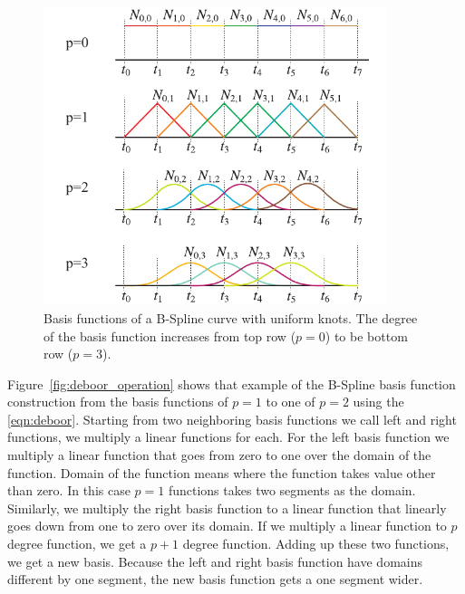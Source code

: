 \begin{figure}[htbp!]
\center
\includegraphics[width=100mm]{images/deboor_basis.pdf}
\caption{Basis functions of a B-Spline curve with uniform knots. The degree of the basis function increases from top row ($p=0$) to be bottom row ($p=3$). }
\label{fig:deboor_basis}
\end{figure}



Figure~\ref{fig:deboor_operation} shows that example of the B-Spline basis function construction from the basis functions of $p=1$ to one of $p=2$ using the \eqref{eqn:deboor}.
%
Starting from two neighboring basis functions we call left and right functions, we multiply a linear functions for each.
%
For the left basis function we multiply a linear function that goes from zero to one over the domain of the function. 
%
Domain of the function means where the function takes value other than zero. 
%
In this case $p=1$ functions takes two segments as the domain.
%
Similarly, we multiply the right basis function to a linear function that linearly goes down from one to zero over its domain.
%
If we multiply a linear function to $p$ degree function, we get a $p+1$ degree function. 
%
Adding up these two functions, we get a new basis. 
%
Because the left and right basis function have domains different by one segment, the new basis function gets a one segment wider. 





